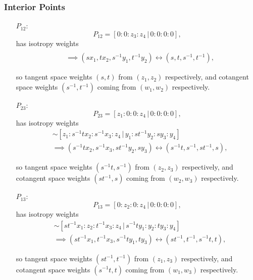 \documentclass{article}
\begin{document}
	\subsubsection{Interior Points}
	
	\begin{itemize}
		\item[$P_{12}$:]
		\[
		P_{12} = [ 0 : 0 : z_{3} : z_{4} \, | \, 0 : 0: 0 : 0 ],
		\]
		has isotropy weights
		\begin{align*}
			[sx_{1} : tx_{2} : z_{3} : z_{4} \, | \, s^{-1}y_{1} : t^{-1}y_{2} : y_{3} : y_{4}] & \\ &\implies (sx_{1}, tx_{2}, s^{-1}y_{1}, t^{-1}y_{2}) \longleftrightarrow (s, t, s^{-1}, t^{-1}),
		\end{align*}
		
		so tangent space weights $(s, t)$ from $(z_{1}, z_{2})$ respectively, and cotangent space weights $(s^{-1}, t^{-1})$ coming from $(w_{1}, w_{2})$ respectively.
		
		\item[$P_{23}$:]
		\[
		P_{23} = [ z_{1} : 0 : 0 : z_{4} \, | \, 0 : 0: 0 : 0 ],
		\]
		has isotropy weights
		\begin{align*}
			[sz_{1} : tx_{2} : x_{3} : z_{4} \, | \, s^{-1}y_{1} : t^{-1}y_{2} : y_{3} : y_{4}] &\sim [z_{1} : s^{-1}tx_{2} : s^{-1}x_{3} : z_{4} \, | \, y_{1} : st^{-1}y_{2} : sy_{3} : y_{4}]  \\ &\implies (s^{-1}tx_{2}, s^{-1}x_{3}, st^{-1}y_{2}, sy_{3}) \longleftrightarrow (s^{-1}t, s^{-1}, st^{-1}, s),
		\end{align*}
		
		so tangent space weights $(s^{-1}t,s^{-1})$ from $(z_{2}, z_{3})$ respectively, and cotangent space weights $(st^{-1}, s)$ coming from $(w_{2}, w_{3})$ respectively.
		
		\item[$P_{13}$:]
		\[
		P_{13} = [ 0 : z_{2} : 0 : z_{4} \, | \, 0 : 0: 0 : 0 ],
		\]
		has isotropy weights
		\begin{align*}
			[sx_{1} : tz_{2} : x_{3} : z_{4} \, | \, s^{-1}y_{1} : t^{-1}y_{2} : y_{3} : y_{4}] &\sim [st^{-1}x_{1} : z_{2} : t^{-1}x_{3} : z_{4} \, | \, s^{-1}ty_{1} : y_{2} :t y_{3} : y_{4}] \\ &\implies (st^{-1}x_{1}, t^{-1}x_{3}, s^{-1}ty_{1}, ty_{3}) \longleftrightarrow (st^{-1}, t^{-1}, s^{-1}t, t),
		\end{align*}
		
		so tangent space weights $(st^{-1},t^{-1})$ from $(z_{1}, z_{3})$ respectively, and cotangent space weights $(s^{-1}t, t)$ coming from $(w_{1}, w_{3})$ respectively.
		

\end{itemize}
\end{document}
